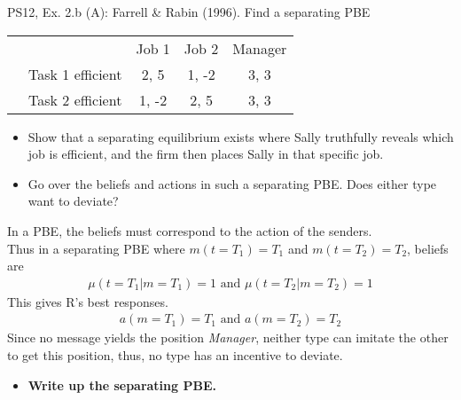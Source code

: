 \begin{frame}{PS12, Ex. 2.b (A): Farrell \& Rabin (1996). Find a separating PBE}
    \begin{table}
      \begin{tabular}{ll|c|c|c|}
          & \multicolumn{1}{c}{} & \multicolumn{1}{c}{Job 1} & \multicolumn{1}{c}{Job 2} & \multicolumn{1}{c}{Manager} \\\cline{3-5}
          \parbox[t]{20mm}{}
           & Task 1 efficient & 2, 5 & 1, -2 & 3, 3 \\
           & Task 2 efficient & 1, -2 & 2, 5 & 3, 3 \\
      \end{tabular}
    \end{table}\vspace{-12pt}
    \begin{itemize}
      \item[(b)] Show that a separating equilibrium exists where Sally truthfully reveals which job is efficient, and the firm then places Sally in that specific job.
      \item[Step 1:] Go over the beliefs and actions in such a separating PBE. Does either type want to deviate?
    \end{itemize}\vspace{-6pt}
    In a PBE, the beliefs must correspond to the action of the senders.\\
    Thus in a separating PBE where $m(t=T_1)=T_1$ and $m(t=T_2)=T_2$, beliefs are\vspace{-2pt}
    \begin{align*}
      \mu(t=T_1|m=T_1)=1\text{ and }\mu(t=T_2|m=T_2)=1
    \end{align*}
    This gives R's best responses.
    \vspace{-2pt}
    \begin{align*}
      a(m=T_1)=T_1\text{ and }a(m=T_2)=T_2
    \end{align*}
    Since no message yields the position \textit{Manager}, neither type can imitate the other to get this position, thus, no type has an incentive to deviate.\vspace{-6pt}
    \begin{itemize}
      \item[Step 2:] \textbf{Write up the separating PBE.}
    \end{itemize}
    \vfill\null
\end{frame}
